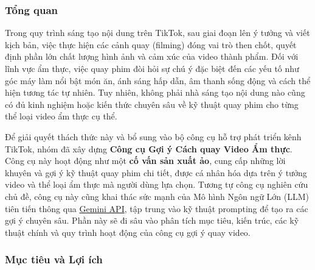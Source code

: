 \subsubsection{Tổng quan}

Trong quy trình sáng tạo nội dung trên TikTok, sau giai đoạn lên ý tưởng và viết kịch bản, việc thực hiện các cảnh quay (filming) đóng vai trò then chốt, quyết định phần lớn chất lượng hình ảnh và cảm xúc của video thành phẩm. Đối với lĩnh vực ẩm thực, việc quay phim đòi hỏi sự chú ý đặc biệt đến các yếu tố như góc máy làm nổi bật món ăn, ánh sáng hấp dẫn, âm thanh sống động và cách thể hiện tương tác tự nhiên. Tuy nhiên, không phải nhà sáng tạo nội dung nào cũng có đủ kinh nghiệm hoặc kiến thức chuyên sâu về kỹ thuật quay phim cho từng thể loại video ẩm thực cụ thể.

Để giải quyết thách thức này và bổ sung vào bộ công cụ hỗ trợ phát triển kênh TikTok, nhóm đã xây dựng \textbf{Công cụ Gợi ý Cách quay Video Ẩm thực}. Công cụ này hoạt động như một \textbf{cố vấn sản xuất ảo}, cung cấp những lời khuyên và gợi ý kỹ thuật quay phim chi tiết, được cá nhân hóa dựa trên ý tưởng video và thể loại ẩm thực mà người dùng lựa chọn. Tương tự công cụ nghiên cứu chủ đề, công cụ này cũng khai thác sức mạnh của Mô hình Ngôn ngữ Lớn (LLM) tiên tiến thông qua \href{https://ai.google.dev/}{Gemini API}, tập trung vào kỹ thuật prompting để tạo ra các gợi ý chuyên sâu. Phần này sẽ đi sâu vào phân tích mục tiêu, kiến trúc, các kỹ thuật chính và quy trình hoạt động của công cụ gợi ý quay video.

\subsubsection{Mục tiêu và Lợi ích}

